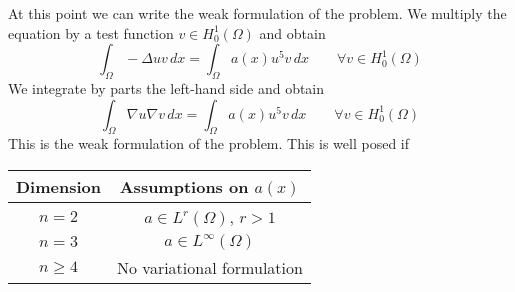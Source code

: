    At this point we can write the weak formulation of the problem. We multiply the equation by a test function \(v \in H^1_0(\Omega)\) and obtain 
    \[
        \int_\Omega - \Delta u v \, dx = \int_\Omega a(x) u^5 v \, dx \qquad \forall v \in H^1_0(\Omega)
    \]
    We integrate by parts the left-hand side and obtain
    \[
        \int_\Omega \nabla u \nabla v \, dx = \int_\Omega a(x) u^5 v \, dx \qquad \forall v \in H^1_0(\Omega)
    \]
    This is the weak formulation of the problem. This is well posed if 
    \begin{table}[h]
        \centering
        \begin{tabular}{|c|c|}
            \hline
            Dimension & Assumptions on $a(x)$ \\
            \hline
            $n = 2$ & $a \in L^r(\Omega)$, $r > 1$ \\
            $n = 3$ & $a \in L^\infty(\Omega)$ \\
            $n \geq 4$ & No variational formulation \\
            \hline
        \end{tabular}
    \end{table}
    
